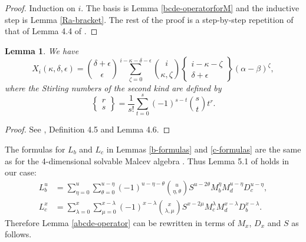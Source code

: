 \documentclass{amsart}
\theoremstyle{plain}
\newtheorem{lemma}{Lemma}[section]
\theoremstyle{definition}
\begin{document}
\begin{proof}
Induction on $i$. The basis is Lemma \ref{bcde-operatorforM} and the inductive
step is Lemma \ref{Ra-bracket}. The rest of the proof is a step-by-step
repetition of that of Lemma 4.4 of \cite{BHPU}.
\end{proof}

\begin{lemma}\label{X-function}
We have
  \[
  X_i(\kappa,\delta,\epsilon)
  =
  \binom{\delta{+}\epsilon}{\epsilon}
  \sum_{\zeta=0}^{i{-}\kappa{-}\delta{-}\epsilon}
  \binom{i}{\kappa,\zeta}
  \left\{ \begin{matrix}
  i{-}\kappa{-}\zeta \\ \delta{+}\epsilon
  \end{matrix} \right\}
  (\alpha{-}\beta)^\zeta,
  \]
where the Stirling numbers of the second kind are defined by
  \[
  \left\{ \begin{matrix} r \\ s \end{matrix} \right\}
  =
  \frac{1}{s!} \sum_{t=0}^s (-1)^{s-t} \binom{s}{t} t^r.
  \]
\end{lemma}

\begin{proof}
See \cite{BHPU}, Definition 4.5 and Lemma 4.6.
\end{proof}

The formulas for $L_b$ and $L_c$ in Lemmas \ref{b-formulas} and
\ref{c-formulas} are the same as for the 4-dimensional solvable Malcev algebra
\cite{BHPU}. Thus Lemma 5.1 of \cite{BHPU} holds in our case:
  \allowdisplaybreaks
  \begin{align}
  L_b^u
  &=
  \sum_{\eta=0}^u
  \sum_{\theta=0}^{u-\eta}
  (-1)^{u-\eta-\theta}
  \binom{u}{\eta,\theta}
  S^{u-2\theta}
  M_b^{\eta}
  M_d^{u-\eta}
  D_c^{u-\eta},
  \label{Lb-formula}
  \\
  L_c^x
  &=
  \sum_{\lambda=0}^x
  \sum_{\mu=0}^{x-\lambda}
  (-1)^{x-\lambda}
  \binom{x}{\lambda,\mu}
  S^{x-2\mu}
  M_c^{\lambda}
  M_d^{x-\lambda}
  D_b^{x-\lambda}.
  \label{Lc-formula}
  \end{align}
Therefore Lemma \ref{abcde-operator} can be rewritten in terms of $M_x$, $D_x$
and $S$ as follows.
\end{document}
